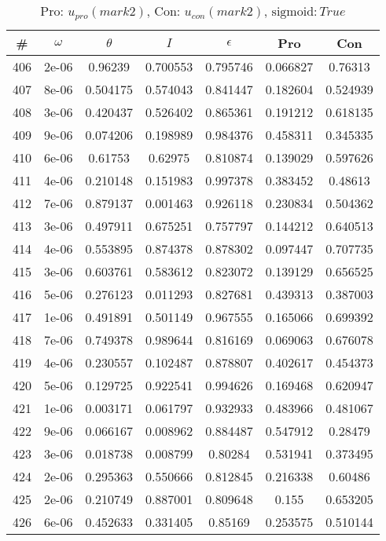 \newpage
\begin{table}
\caption{Pro: $u_{pro} (mark 2)$, Con: $u_{con} (mark 2)$, $\mathrm{sigmoid}: True$}
\begin{tabular*}{\linewidth}{c|c|c|c|c|c|c}
\# & $\omega$ & $\theta$ & $I$ & $\epsilon$ & Pro & Con \\
\hline
406 & 2e-06 & 0.96239 & 0.700553 & 0.795746 & 0.066827 & 0.76313\\
407 & 8e-06 & 0.504175 & 0.574043 & 0.841447 & 0.182604 & 0.524939\\
408 & 3e-06 & 0.420437 & 0.526402 & 0.865361 & 0.191212 & 0.618135\\
409 & 9e-06 & 0.074206 & 0.198989 & 0.984376 & 0.458311 & 0.345335\\
410 & 6e-06 & 0.61753 & 0.62975 & 0.810874 & 0.139029 & 0.597626\\
411 & 4e-06 & 0.210148 & 0.151983 & 0.997378 & 0.383452 & 0.48613\\
412 & 7e-06 & 0.879137 & 0.001463 & 0.926118 & 0.230834 & 0.504362\\
413 & 3e-06 & 0.497911 & 0.675251 & 0.757797 & 0.144212 & 0.640513\\
414 & 4e-06 & 0.553895 & 0.874378 & 0.878302 & 0.097447 & 0.707735\\
415 & 3e-06 & 0.603761 & 0.583612 & 0.823072 & 0.139129 & 0.656525\\
416 & 5e-06 & 0.276123 & 0.011293 & 0.827681 & 0.439313 & 0.387003\\
417 & 1e-06 & 0.491891 & 0.501149 & 0.967555 & 0.165066 & 0.699392\\
418 & 7e-06 & 0.749378 & 0.989644 & 0.816169 & 0.069063 & 0.676078\\
419 & 4e-06 & 0.230557 & 0.102487 & 0.878807 & 0.402617 & 0.454373\\
420 & 5e-06 & 0.129725 & 0.922541 & 0.994626 & 0.169468 & 0.620947\\
421 & 1e-06 & 0.003171 & 0.061797 & 0.932933 & 0.483966 & 0.481067\\
422 & 9e-06 & 0.066167 & 0.008962 & 0.884487 & 0.547912 & 0.28479\\
423 & 3e-06 & 0.018738 & 0.008799 & 0.80284 & 0.531941 & 0.373495\\
424 & 2e-06 & 0.295363 & 0.550666 & 0.812845 & 0.216338 & 0.60486\\
425 & 2e-06 & 0.210749 & 0.887001 & 0.809648 & 0.155 & 0.653205\\
426 & 6e-06 & 0.452633 & 0.331405 & 0.85169 & 0.253575 & 0.510144\\

\end{tabular*}
\end{table}
